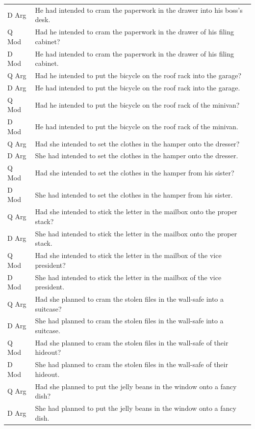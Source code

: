 \documentclass[12pt,oneside]{book}
\begin{document}
\begin{longtable}{ll}
D Arg & He had intended to cram the paperwork in the drawer into his boss's desk.\\
Q Mod & Had he intended to cram the paperwork in the drawer of his filing cabinet?\\
D Mod & He had intended to cram the paperwork in the drawer of his filing cabinet.\\
\addlinespace
Q Arg & Had he intended to put the bicycle on the roof rack into the garage?\\
D Arg & He had intended to put the bicycle on the roof rack into the garage.\\
Q Mod & Had he intended to put the bicycle on the roof rack of the minivan?\\
D Mod & He had intended to put the bicycle on the roof rack of the minivan.\\
\addlinespace
Q Arg & Had she intended to set the clothes in the hamper onto the dresser?\\
D Arg & She had intended to set the clothes in the hamper onto the dresser.\\
Q Mod & Had she intended to set the clothes in the hamper from his sister?\\
D Mod & She had intended to set the clothes in the hamper from his sister.\\
\addlinespace
Q Arg & Had she intended to stick the letter in the mailbox onto the proper stack?\\
D Arg & She had intended to stick the letter in the mailbox onto the proper stack.\\
Q Mod & Had she intended to stick the letter in the mailbox of the vice president?\\
D Mod & She had intended to stick the letter in the mailbox of the vice president.\\
\addlinespace
Q Arg & Had she planned to cram the stolen files in the wall-safe into a suitcase?\\
D Arg & She had planned to cram the stolen files in the wall-safe into a suitcase.\\
Q Mod & Had she planned to cram the stolen files in the wall-safe of their hideout?\\
D Mod & She had planned to cram the stolen files in the wall-safe of their hideout.\\
\addlinespace
Q Arg & Had she planned to put the jelly beans in the window onto a fancy dish?\\
D Arg & She had planned to put the jelly beans in the window onto a fancy dish.\\

\end{longtable}
\end{document}
